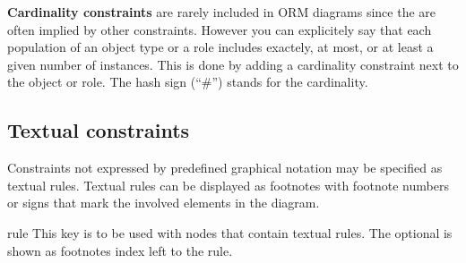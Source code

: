 \documentclass[a4paper,10pt]{article}
\begin{document}
\noindent\textbf{Cardinality constraints} are rarely included in ORM diagrams since the are often implied by other constraints. However you can explicitely say that each population of an object type or a role includes exactely, at most, or at least a given number of instances. This is done by adding a cardinality constraint next to the object or role. The hash sign (``\#'') stands for the cardinality. 

\begin{codeexample}[]
\end{codeexample}



\subsection{Textual constraints}
Constraints not expressed by predefined graphical notation may be specified as textual rules. Textual rules can be displayed as footnotes with footnote numbers or signs that mark the involved elements in the diagram.

\begin{stylekey}{rule}
This key is to be used with nodes that contain textual rules. The optional  is shown as footnotes index left to the rule.
\begin{codeexample}[]
\end{codeexample}
\end{stylekey}
\end{document}
